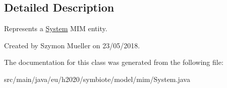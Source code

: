 \subsection{Detailed Description}
Represents a \hyperlink{classeu_1_1h2020_1_1symbiote_1_1model_1_1mim_1_1System}{System} M\+IM entity.

Created by Szymon Mueller on 23/05/2018. 

The documentation for this class was generated from the following file\+:\begin{DoxyCompactItemize}
\item 
src/main/java/eu/h2020/symbiote/model/mim/System.\+java\end{DoxyCompactItemize}
